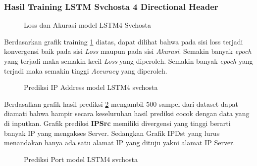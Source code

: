 \documentclass[./skripsi.tex]{subfiles}
\begin{document}
\subsubsection{Hasil Training LSTM Svchosta 4 Directional Header}

\begin{figure}[H]
    \centering
    \caption{Loss dan Akurasi model LSTM4 Svchosta}
    \label{fig:lstm4_svchosta}
\end{figure}

\par Berdasarkan grafik training \ref{fig:lstm4_svchosta} diatas, dapat dilihat bahwa pada sisi loss terjadi konvergensi baik pada sisi \textit{Loss} maupun pada sisi \textit{Akurasi}. Semakin banyak \textit{epoch} yang terjadi maka semakin kecil \textit{Loss} yang diperoleh. Semakin banyak \textit{epoch} yang terjadi maka semakin tinggi \textit{Accuracy} yang diperoleh.

\begin{figure}[H]
    \centering
    \caption{Prediksi IP Address model LSTM4 svchosta}
    \label{fig:lstm4_svchosta_pred1}
\end{figure}

\par Berdasalkan grafik hasil prediksi \ref{fig:lstm4_svchosta_pred1} mengambil 500 sampel dari dataset dapat diamati bahwa hampir secara keseluruhan hasil prediksi cocok dengan data yang di inputkan. Grafik prediksi \textbf{IPSrc} memiliki divergensi yang tinggi berarti banyak IP yang mengakses Server. Sedangkan Grafik IPDst yang lurus menandakan hanya ada satu alamat IP yang dituju yakni alamat IP Server.


\begin{figure}
    \centering
    \caption{Prediksi Port model LSTM4 svchosta}
    \label{fig:lstm4_svchosta_pred2}
\end{figure}
\end{document}
